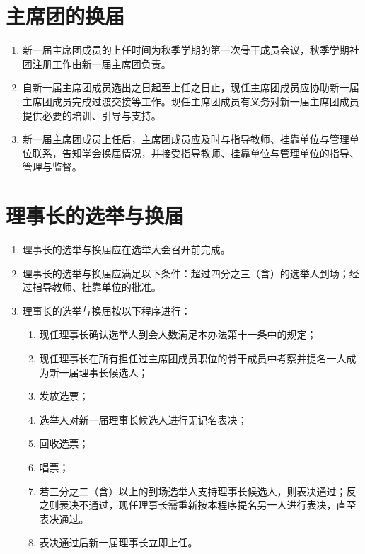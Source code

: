 \section{主席团的换届}

\begin{enumerate}[resume]
    \item 新一届主席团成员的上任时间为秋季学期的第一次骨干成员会议，秋季学期社团注册工作由新一届主席团负责。
    
    \item 自新一届主席团成员选出之日起至上任之日止，现任主席团成员应协助新一届主席团成员完成过渡交接等工作。现任主席团成员有义务对新一届主席团成员提供必要的培训、引导与支持。
    
    \item 新一届主席团成员上任后，主席团成员应及时与指导教师、挂靠单位与管理单位联系，告知学会换届情况，并接受指导教师、挂靠单位与管理单位的指导、管理与监督。
\end{enumerate}

\section{理事长的选举与换届}

\begin{enumerate}[resume]
    \item 理事长的选举与换届应在选举大会召开前完成。
    
    \item 理事长的选举与换届应满足以下条件：超过四分之三（含）的选举人到场；经过指导教师、挂靠单位的批准。
    
    \item 理事长的选举与换届按以下程序进行：
    
    \begin{enumerate}
        \item 现任理事长确认选举人到会人数满足本办法第十一条中的规定；
        \item 现任理事长在所有担任过主席团成员职位的骨干成员中考察并提名一人成为新一届理事长候选人；
        \item 发放选票；
        \item 选举人对新一届理事长候选人进行无记名表决；
        \item 回收选票；
        \item 唱票；
        \item 若三分之二（含）以上的到场选举人支持理事长候选人，则表决通过；反之则表决不通过，现任理事长需重新按本程序提名另一人进行表决，直至表决通过。
        \item 表决通过后新一届理事长立即上任。
    \end{enumerate}
    
\end{enumerate}

